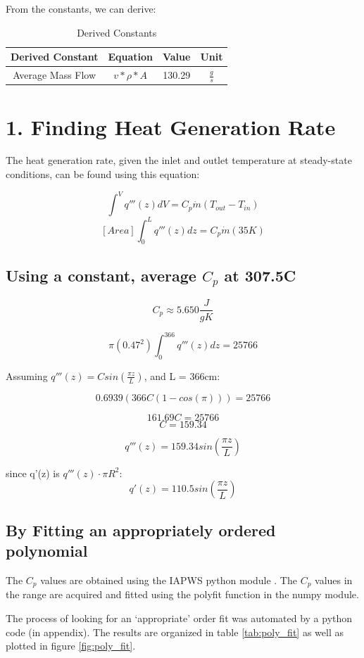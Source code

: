 \documentclass[12pt,letterpaper]{article}
\begin{document}
From the constants, we can derive:
\begin{table}[h]
     \centering
    \begin{tabular}{cccc}
    \hline
       Derived Constant & Equation & Value & Unit \\
    \hline
       Average Mass Flow & $ v * \rho * A $ & 130.29 & $\frac{g}{s}$ \\
    \hline
    \end{tabular}
    \caption {Derived Constants}
    \label{tab:der_constants}
\end{table}



\section* {1. Finding Heat Generation Rate}

The heat generation rate, given the inlet and outlet temperature
at steady-state conditions, can be found using this equation:

\[\int^{V} q'''(z) dV = C_p \dot{m} (T_{out} - T_{in})\]
\[[Area] \int^{L}_{0} q'''(z) dz = C_p \dot{m} (35 K)\]

\subsection*{Using a constant, average $C_p$ at 307.5C}
\[C_p \approx 5.650 \frac{J}{g K}\]

\[ \pi (0.47^2)  \int^{366}_{0} q'''(z) dz = 25766\]

Assuming $q'''(z) = C sin(\frac{\pi z}{L})$,
and L = 366cm:

\[ 0.6939 (366C(1-cos(\pi))) = 25766\]

\[161.69C = 25766\]
\[C = 159.34 \]

\[q'''(z) = 159.34 sin(\frac{\pi z}{L})\]

since q'(z) is $q'''(z) \cdot \pi R^2$:
\[q'(z) = 110.5 sin(\frac{\pi z}{L})\]

\subsection*{By Fitting an appropriately ordered polynomial}

The $C_p$ values are obtained using the IAPWS python
module \cite{romera_iapws:_2017}. The $C_p$ values
in the range are acquired and fitted using
the polyfit function in the numpy module.


The process of looking for an `appropriate' order fit was automated
by a python code (in appendix). The results are organized in table \ref{tab:poly_fit} as well as plotted in figure \ref{fig:poly_fit}.
\end{document}

